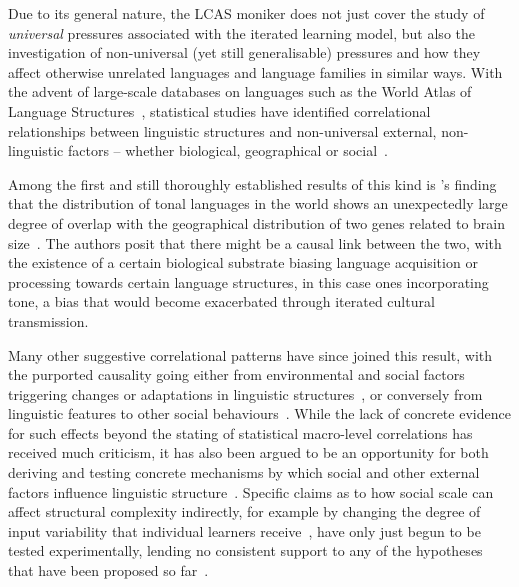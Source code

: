 Due to its general nature, the LCAS moniker does not just cover the study of \emph{universal} pressures associated with the iterated learning model, but also the investigation of non-universal (yet still generalisable) pressures and how they affect otherwise unrelated languages and language families in similar ways.
With the advent of large-scale databases on languages such as the World Atlas of Language Structures~\citep[WALS][]{WALS2013}, statistical studies have identified correlational relationships between linguistic structures and non-universal external, non-linguistic factors -- whether biological, geographical or social~\citep{Ladd2015}.

Among the first and still thoroughly established results of this kind is \citeauthor{Dediu2007}'s finding that the distribution of tonal languages in the world shows an unexpectedly large degree of overlap with the geographical distribution of two genes related to brain size~\citeyearpar{Dediu2007}. The authors posit that there might be a causal link between the two, with the existence of a certain biological substrate biasing language acquisition or processing towards certain language structures, in this case ones incorporating tone, a bias that would become exacerbated through iterated cultural transmission.

Many other suggestive correlational patterns have since joined this result, with the purported causality going either from environmental and social factors triggering changes or adaptations in linguistic structures~\citep{Hay2007,Lupyan2010}, or conversely from linguistic features to other social behaviours~\citep{Chen2013}. While the lack of concrete evidence for such effects beyond the stating of statistical macro-level correlations has received much criticism, it has also been argued to be an opportunity for both deriving and testing concrete mechanisms by which social and other external factors influence linguistic structure~\citep{Roberts2012,Nettle2012,Roberts2013correlation}. Specific claims as to how social scale can affect structural complexity indirectly, for example by changing the degree of input variability that individual learners receive~\citep{Wray2007}, have only just begun to be tested experimentally, lending no consistent support to any of the hypotheses that have been proposed so far~\citep{Atkinson2016}.

